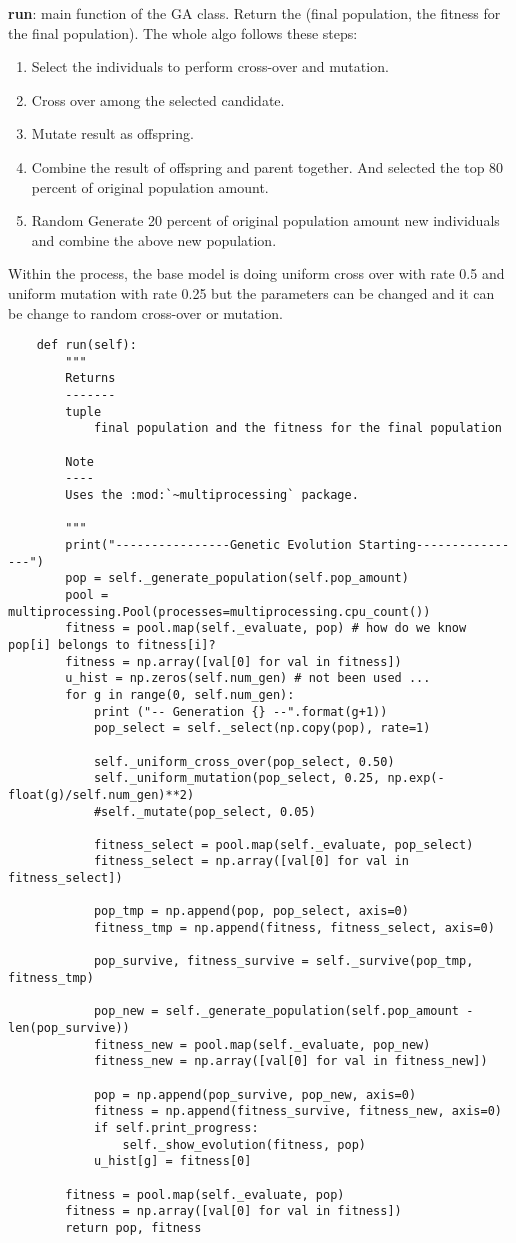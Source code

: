 \documentclass[12pt]{article}
\begin{document}
\textbf{run}: main function of the GA class. Return the (final population, the fitness for the final population).
The whole algo follows these steps:
\begin{enumerate}
  \item Select the individuals to perform cross-over and mutation.
  \item Cross over among the selected candidate.
  \item Mutate result as offspring.
  \item Combine the result of offspring and parent together. And selected the top
		80 percent of original population amount.
  \item Random Generate 20 percent of original population amount new individuals
		and combine the above new population.
\end{enumerate}
 Within the process, the base model is doing uniform cross over with rate 0.5 and uniform mutation with rate 0.25 but the parameters can be changed and it can be change to random cross-over or mutation.
\begin{verbatim}
	def run(self):
		"""
		Returns
		-------
		tuple
			final population and the fitness for the final population

		Note
		----
		Uses the :mod:`~multiprocessing` package.

		"""
		print("----------------Genetic Evolution Starting----------------")
		pop = self._generate_population(self.pop_amount)
		pool = multiprocessing.Pool(processes=multiprocessing.cpu_count())
		fitness = pool.map(self._evaluate, pop) # how do we know pop[i] belongs to fitness[i]?
		fitness = np.array([val[0] for val in fitness])
		u_hist = np.zeros(self.num_gen) # not been used ...
		for g in range(0, self.num_gen):
			print ("-- Generation {} --".format(g+1))
			pop_select = self._select(np.copy(pop), rate=1)
			
			self._uniform_cross_over(pop_select, 0.50)
			self._uniform_mutation(pop_select, 0.25, np.exp(-float(g)/self.num_gen)**2)
			#self._mutate(pop_select, 0.05)
			
			fitness_select = pool.map(self._evaluate, pop_select)
			fitness_select = np.array([val[0] for val in fitness_select])
			
			pop_tmp = np.append(pop, pop_select, axis=0)
			fitness_tmp = np.append(fitness, fitness_select, axis=0)

			pop_survive, fitness_survive = self._survive(pop_tmp, fitness_tmp)

			pop_new = self._generate_population(self.pop_amount - len(pop_survive))
			fitness_new = pool.map(self._evaluate, pop_new)
			fitness_new = np.array([val[0] for val in fitness_new])

			pop = np.append(pop_survive, pop_new, axis=0)
			fitness = np.append(fitness_survive, fitness_new, axis=0)
			if self.print_progress:
				self._show_evolution(fitness, pop)
			u_hist[g] = fitness[0]

		fitness = pool.map(self._evaluate, pop)
		fitness = np.array([val[0] for val in fitness])
		return pop, fitness
\end{verbatim}
\end{document}
